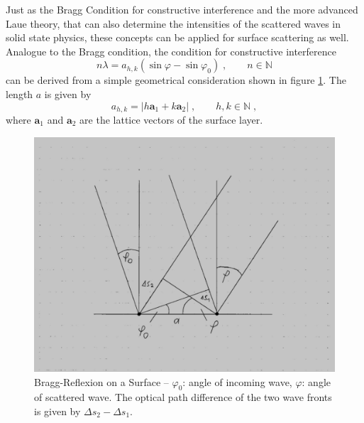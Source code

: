 \documentclass[a4paper]{scrartcl}
\numberwithin{equation}{section}
\numberwithin{figure}{section}
\numberwithin{table}{section}
\newcommand{\eq}[2]{\begin{equation}#1\label{#2}\end{equation}}
\newcommand{\ve}[1]{\mathbf{ #1} }
\begin{document}
Just as the Bragg Condition for constructive interference and the more advanced Laue theory, that can also determine the intensities of the scattered waves in solid state physics, these concepts can be applied for surface scattering as well. Analogue to the Bragg condition, the condition for constructive interference 
\eq{n \lambda = a_{h,k} (\sin \varphi - \sin \varphi_0 ) \;, \qquad n \in \mathbb N }{bragg}
can be derived from a simple geometrical consideration shown in figure \ref{fig:bragg}. The length $a$ is given by
\eq{a_{h,k} = |h \ve a_1 + k \ve a_2|\;, \qquad h,k \in \mathbb N \; , }{}
where $\ve a_1$ and $\ve a_2$ are the lattice vectors of the surface layer.
\begin{figure}
  \centering
   	\includegraphics[width=0.5\linewidth]{pic/bragg.jpg}

 \caption{ Bragg-Reflexion on a Surface -- $\varphi_0$: angle of incoming wave, $\varphi$: angle of scattered wave. The optical path difference of the two wave fronts is given by $\Delta s_2 - \Delta s_1$.}
        \label{fig:bragg}
\end{figure}
\FloatBarrier
\end{document}
